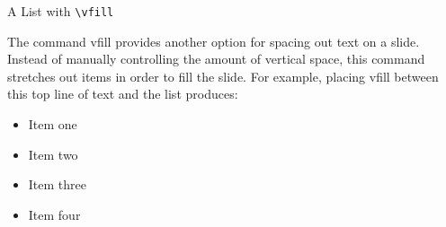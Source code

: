 \begin{frame}{A List with \texttt{\textbackslash vfill}}

The command vfill provides another option for spacing out text on a slide. Instead of manually controlling the amount of vertical space, this command stretches out items in order to fill the slide.  For example, placing vfill between this top line of text and the list produces:

\vfill
\begin{itemize}

\item Item one

\item Item two 

\item Item three 

\item Item four

\end{itemize} 


\end{frame}




